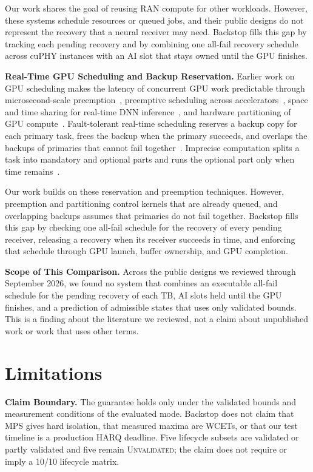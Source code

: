 \documentclass[acmsmall,screen,review,anonymous]{acmart}
\newcommand{\sys}{Backstop\xspace}
\newcommand{\UQ}{\textsc{Unvalidated}\xspace}
\begin{document}
Our work shares the goal of reusing RAN compute for other workloads. However, these systems schedule
resources or queued jobs, and their public designs do not represent the recovery that a neural receiver
may need. \sys fills this gap by tracking each pending recovery and by combining one all-fail recovery
schedule across cuPHY instances with an AI slot that stays owned until the GPU finishes.

\noindent\textbf{Real-Time GPU Scheduling and Backup Reservation.}
Earlier work on GPU scheduling makes the latency of concurrent GPU work predictable through
microsecond-scale preemption~\cite{reef}, preemptive scheduling across accelerators~\cite{xsched}, space
and time sharing for real-time DNN inference~\cite{daris}, and hardware partitioning of GPU
compute~\cite{nvtaskset}. Fault-tolerant real-time scheduling reserves a backup copy for each primary task,
frees the backup when the primary succeeds, and overlaps the backups of primaries that cannot fail
together~\cite{ghosh1997primarybackup}. Imprecise computation splits a task into mandatory and optional
parts and runs the optional part only when time remains~\cite{liu1991imprecise}.

Our work builds on these reservation and preemption techniques. However, preemption and partitioning
control kernels that are already queued, and overlapping backups assumes that primaries do not fail
together. \sys fills this gap by checking one all-fail schedule for the recovery of every pending
receiver, releasing a recovery when its receiver succeeds in time, and enforcing that schedule through GPU
launch, buffer ownership, and GPU completion.

\noindent\textbf{Scope of This Comparison.}
Across the public designs we reviewed through September 2026, we found no system that combines an
executable all-fail schedule for the pending recovery of each TB, AI slots held until the GPU finishes,
and a prediction of admissible states that uses only validated bounds. This is a finding about the
literature we reviewed, not a claim about unpublished work or work that uses other terms.

\section{Limitations}
\label{sec:limitations}

\noindent\textbf{Claim Boundary.}
The guarantee holds only under the validated bounds and measurement conditions of the evaluated mode.
\sys does not claim that MPS gives hard isolation, that measured maxima are WCETs, or that our test
timeline is a production HARQ deadline. Five lifecycle subsets are validated or partly validated and five
remain \UQ; the claim does not require or imply a 10/10 lifecycle matrix.
\end{document}
